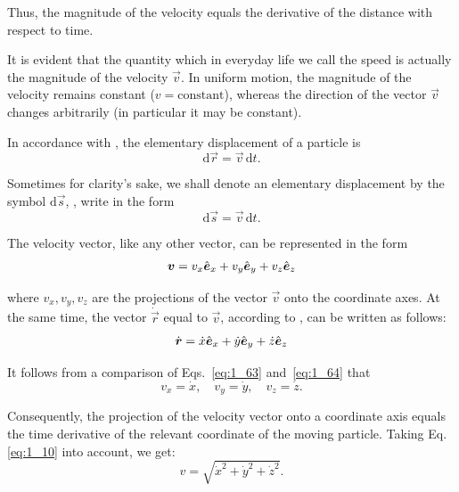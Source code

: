 \noindent
Thus, the magnitude of the velocity equals the derivative of the distance with respect to time.

It is evident that the quantity which in everyday life we call the speed is actually the magnitude of the velocity $\vec{v}$. In uniform motion, the magnitude of the velocity remains constant ($v=\text{constant}$), whereas the direction of the vector $\vec{v}$ changes arbitrarily (in particular it may be constant).

In accordance with , the elementary displacement of a particle is
\begin{equation}\label{eq:1_61}
\mathrm{d}\vec{r} = \vec{v}\,\mathrm{d}{t}.
\end{equation}

\noindent
Sometimes for clarity's sake, we shall denote an elementary displacement by the symbol $\mathrm{d}\vec{s}$, \ie, write  in the form
\begin{equation}\label{eq:1_62}
\mathrm{d}\vec{s} = \vec{v}\,\mathrm{d}{t}.
\end{equation}

The velocity vector, like any other vector, can be represented in the form
\begin{equation}\label{eq:1_63}
\boldsymbol{v} = v_x\hat{\boldsymbol{e}}_{x} + v_y\hat{\boldsymbol{e}}_{y} + v_z\hat{\boldsymbol{e}}_{z}
\end{equation}

\noindent
where $v_x, v_y, v_z$ are the projections of the vector $\vec{v}$ onto the coordinate axes. At the same time, the vector $\dot{\vec{r}}$ equal to $\vec{v}$, according to , can be written as follows:
\vspace{-12pt}
\begin{equation}\label{eq:1_64}
\dot{\boldsymbol{r}} = \dot{x}\hat{\boldsymbol{e}}_{x} + \dot{y}\hat{\boldsymbol{e}}_{y} + \dot{z}\hat{\boldsymbol{e}}_{z}
\end{equation}

\noindent
It follows from a comparison of Eqs.~\eqref{eq:1_63} and~\eqref{eq:1_64} that
\begin{equation}\label{eq:1_65}
v_x = \dot{x},\quad v_y = \dot{y},\quad v_z = \dot{z}.
\end{equation}

\noindent
Consequently, the projection of the velocity vector onto a coordinate axis equals the time derivative of the relevant coordinate of the moving particle. Taking Eq. \eqref{eq:1_10} into account, we get:
\begin{equation}\label{eq:1_66}
v = \sqrt{\dot{x}^2 + \dot{y}^2 + \dot{z}^2}.
\end{equation}

